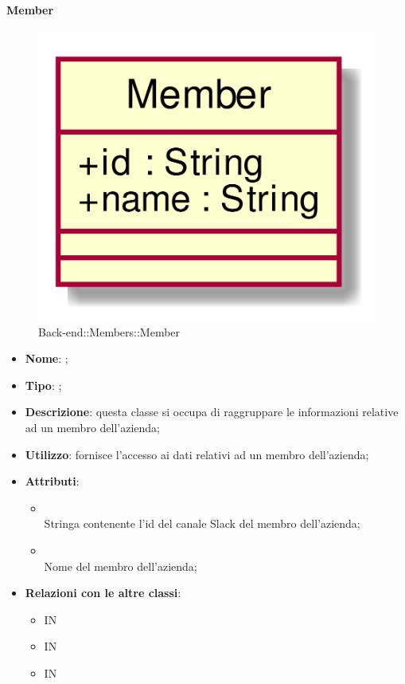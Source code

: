 \hypertarget{Member_label}{\paragraph{Member}}
\begin{figure}[h]
	\centering
	\includegraphics[width=\textwidth,height=\textheight,keepaspectratio]{images/ClassMember.png}
	\caption{Back-end::Members::Member}
\end{figure}
\begin{itemize}
	\item \textbf{Nome}: ;
	\item \textbf{Tipo}: ;
	\item \textbf{Descrizione}: questa classe si occupa di raggruppare le informazioni relative ad un membro dell'azienda;
	\item \textbf{Utilizzo}: fornisce l'accesso ai dati relativi ad un membro dell'azienda;
	\item \textbf{Attributi}:
	\begin{itemize}
		\item[]  \\
		Stringa contenente l'id del canale Slack del membro dell'azienda;
		\item[]  \\
		Nome del membro dell'azienda;
	\end{itemize}
	\item \textbf{Relazioni con le altre classi}:
	\begin{itemize}
		\item IN \hyperlink{<<interface>> MembersDAO_label}{}
		\item IN \hyperlink{MemberObserver_label}{}
		\item IN \hyperlink{MembersDAOSlack_label}{}
	\end{itemize}
\end{itemize}
\FloatBarrier


